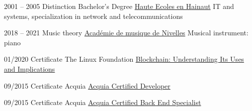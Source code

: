 \begin{minipage}[t]{.48\textwidth}

	\begin{entrylist}
		\entry
			{\tiny{2001 -- 2005}}
            {Distinction}
			{Bachelor's Degree}
            {\href{https://www.heh.be/}{Haute Ecoles en Hainaut}}
			{IT and systems, specialization in network and telecommunications}
	\end{entrylist}

	\begin{entrylist}
		\entry
			{\tiny{2018 -- 2021}}
            {}
			{Music theory}
            {\href{https://academiedenivelles.be/}{Académie de musique de Nivelles}}
			{Musical instrument: piano}
	\end{entrylist}
\end{minipage}
\hfill
\begin{minipage}[t]{.48\textwidth}
	\cvsect{Certificates}

	\begin{entrylist}
		\entry
			{01/2020}
            {}
			{Certificate}
			{The Linux Foundation}
			{\href{https://courses.edx.org/certificates/01fdb9d9242546e8bc45153468dfd785}{Blockchain: Understanding Its Uses and Implications}}
	\end{entrylist}

	\begin{entrylist}
		\entry
			{09/2015}
            {}
			{Certificate}
			{Acquia}
			{\href{https://certification.acquia.com/user/249}{Acquia Certified Developer}}
	\end{entrylist}

	\begin{entrylist}
		\entry
			{09/2015}
            {}
			{Certificate}
			{Acquia}
			{\href{https://certification.acquia.com/user/249}{Acquia Certified Back End Specialist}}
	\end{entrylist}
\end{minipage}



